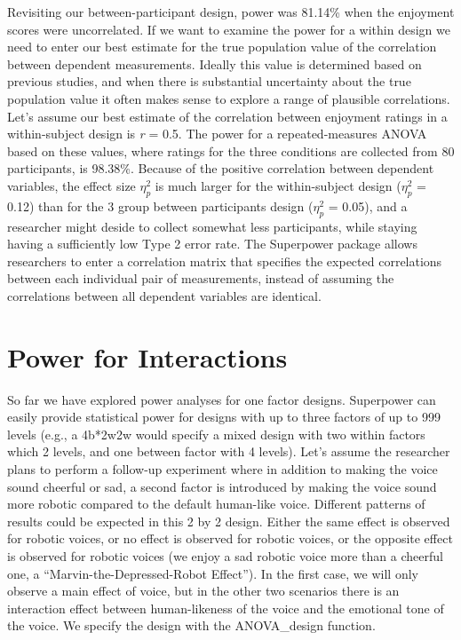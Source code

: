 \documentclass[
  ,man,floatsintext]{apa6}
\begin{document}
Revisiting our between-participant design, power was 81.14\% when the enjoyment scores were uncorrelated.
If we want to examine the power for a within design we need to enter our best estimate for the true population value of the correlation between dependent measurements.
Ideally this value is determined based on previous studies, and when there is substantial uncertainty about the true population value it often makes sense to explore a range of plausible correlations.
Let's assume our best estimate of the correlation between enjoyment ratings in a within-subject design is \emph{r} = 0.5.
The power for a repeated-measures ANOVA based on these values, where ratings for the three conditions are collected from 80 participants, is 98.38\%.
Because of the positive correlation between dependent variables, the effect size \(\eta_p^2\) is much larger for the within-subject design (\(\eta_p^2\) = 0.12) than for the 3 group between participants design (\(\eta_p^2\) = 0.05), and a researcher might deside to collect somewhat less participants, while staying having a sufficiently low Type 2 error rate.
The Superpower package allows researchers to enter a correlation matrix that specifies the expected correlations between each individual pair of measurements, instead of assuming the correlations between all dependent variables are identical.

\hypertarget{power-for-interactions}{%
\section{Power for Interactions}\label{power-for-interactions}}

So far we have explored power analyses for one factor designs.
Superpower can easily provide statistical power for designs with up to three factors of up to 999 levels (e.g., a 4b*2w2w would specify a mixed design with two within factors which 2 levels, and one between factor with 4 levels).
Let's assume the researcher plans to perform a follow-up experiment where in addition to making the voice sound cheerful or sad, a second factor is introduced by making the voice sound more robotic compared to the default human-like voice.
Different patterns of results could be expected in this 2 by 2 design.
Either the same effect is observed for robotic voices, or no effect is observed for robotic voices, or the opposite effect is observed for robotic voices (we enjoy a sad robotic voice more than a cheerful one, a \enquote{Marvin-the-Depressed-Robot Effect}).
In the first case, we will only observe a main effect of voice, but in the other two scenarios there is an interaction effect between human-likeness of the voice and the emotional tone of the voice. We specify the design with the ANOVA\_design function.
\end{document}
